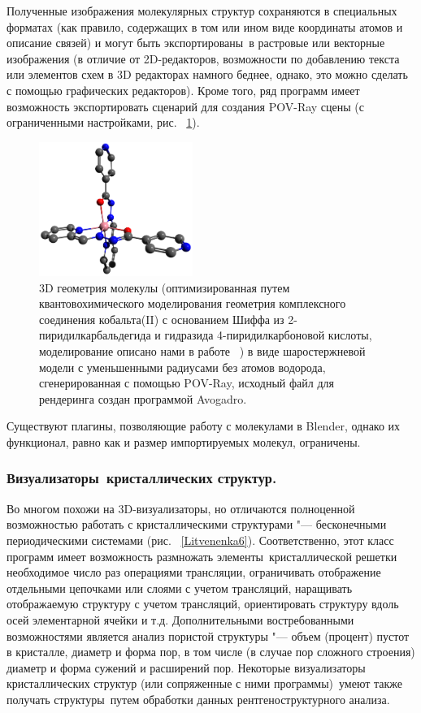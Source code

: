\documentclass[10pt, a5paper]{article}
\begin{document}
Полученные изображения молекулярных структур сохраняются в специальных форматах (как правило, содержащих в том или ином виде координаты атомов и описание связей) и могут быть экспортированы в растровые или векторные изображения (в отличие от 2D-редакторов, возможности по добавлению текста или элементов схем в 3D редакторах намного беднее, однако, это можно сделать с помощью графических редакторов). Кроме того, ряд программ имеет возможность экспортировать сценарий для создания POV-Ray сцены (с ограниченными настройками, рис. ~\ref{Litvenenka5}).

\begin{figure}[h!]
  \centering
  \includegraphics[width=5cm]{20_2016_Litvenenka5.png}
  \caption{3D геометрия молекулы (оптимизированная путем квантовохимического моделирования геометрия комплексного соединения кобальта(II) с основанием Шиффа из 2-пиридилкарбальдегида и гидразида 4-пиридилкарбоновой кислоты, моделирование описано нами в работе ~\cite{Litvenenka3}) в виде шаростержневой модели с уменьшенными радиусами без атомов водорода, сгенерированная с помощью POV-Ray, исходный файл для рендеринга создан программой Avogadro.}
  \label{Litvenenka5}
\end{figure} 
  
Существуют плагины, позволяющие работу с молекулами в \linebreak Blender, однако их функционал, равно как и размер импортируемых молекул, ограничены.

\subsubsection*{Визуализаторы кристаллических структур.}

Во многом похожи на 3D-визуализаторы, но отличаются полноценной возможностью работать с кристаллическими структурами "--- бесконечными периодическими системами (рис. ~\ref{Litvenenka6}). Соответственно, этот класс программ имеет возможность размножать элементы кристаллической решетки необходимое число раз операциями трансляции, ограничивать отображение отдельными цепочками или слоями с учетом трансляций, наращивать отображаемую структуру с учетом трансляций, ориентировать структуру вдоль осей элементарной ячейки и т.д. Дополнительными востребованными возможностями является анализ пористой структуры "--- объем (процент) пустот в кристалле, диаметр и форма пор, в том числе (в случае пор сложного строения) диаметр и форма сужений и расширений пор. Некоторые визуализаторы кристаллических структур (или сопряженные с ними программы) умеют также получать структуры путем обработки данных рентгеноструктурного анализа.
\end{document}
